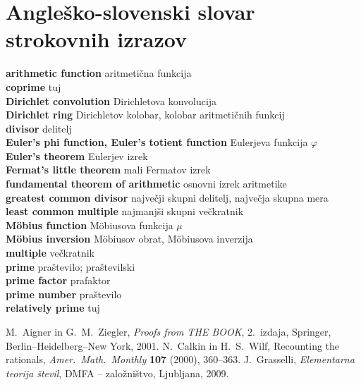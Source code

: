 \documentclass[a4paper,12pt]{article}
\newcommand{\geslo}[2]{\noindent\textbf{#1} \quad \hangindent=1cm #2\\[-1pc]}
\begin{document}
\section*{Angleško-slovenski slovar strokovnih izrazov}


\geslo{arithmetic function}{aritmetična funkcija}

\geslo{coprime}{tuj}

\geslo{Dirichlet convolution}{Dirichletova konvolucija}

\geslo{Dirichlet ring}{Dirichletov kolobar, kolobar aritmetičnih funkcij}

\geslo{divisor}{delitelj}

\geslo{Euler's phi function, Euler's totient function}{Eulerjeva funkcija $\varphi$}

\geslo{Euler's theorem}{Eulerjev izrek}

\geslo{Fermat's little theorem}{mali Fermatov izrek}

\geslo{fundamental theorem of arithmetic}{osnovni izrek aritmetike}

\geslo{greatest common divisor}{največji skupni delitelj, največja skupna mera}

\geslo{least common multiple}{najmanjši skupni večkratnik}

\geslo{M\"obius function}{M\"obiusova funkcija $\mu$}

\geslo{M\"obius inversion}{M\"obiusov obrat, M\"obiusova inverzija}

\geslo{multiple}{večkratnik}

\geslo{prime}{praštevilo; praštevilski}

\geslo{prime factor}{prafaktor}

\geslo{prime number}{praštevilo}

\geslo{relatively prime}{tuj}




\begin{thebibliography}{1}
M.~Aigner in G.~M.~Ziegler, \emph{Proofs from THE BOOK}, 2.\ izdaja, Springer, Berlin--Heidelberg--New York, 2001.
N.~Calkin in H.~S.~Wilf, Recounting the rationals,
\emph{Amer.~Math.~Monthly}  \textbf{107}  (2000),  360--363.
J.~Grasselli, \emph{Elementarna teorija števil}, DMFA -- založništvo, Ljubljana, 2009.
\end{thebibliography}
\end{document}
